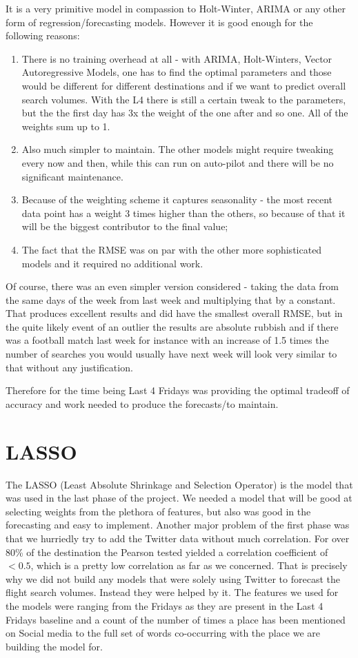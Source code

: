 \documentclass[minf,twoside,singlespacing,parskip,notimes,deptreport]{infthesis} %
\begin{document}
It is a very primitive model in compassion to Holt-Winter, ARIMA or any other form of regression/forecasting models. However it is good enough for the following reasons:
\begin{enumerate}
\item There is no training overhead at all  - with ARIMA, Holt-Winters, Vector Autoregressive Models, one has to find the optimal parameters and those would be different for different destinations and if we want to predict overall search volumes. With the L4 there is still a certain tweak to the parameters, but the the first day has 3x the weight of the one after and so one. All of the weights sum up to 1.
\item Also much simpler to maintain. The other models might require tweaking every now and then, while this can run on auto-pilot and there will be no significant maintenance.
\item Because of the weighting scheme it captures seasonality - the most recent data point has a weight 3 times higher than the others, so  because of that it will be the biggest contributor to the final value; 
\item The fact that the RMSE was on par with the other more sophisticated models and it required no additional work. 
\end{enumerate}

Of course, there was an even simpler version considered - taking the data from the same days of the week from last week and multiplying that by a constant. That produces excellent results and did have the smallest overall RMSE, but in the quite likely event of an outlier the results are absolute rubbish and if there was a football match last week for instance with an increase of 1.5 times the number of searches you would usually have next week will look very similar to that without any justification. 

Therefore for the time being Last 4 Fridays was providing the optimal tradeoff of accuracy and work needed to produce the forecasts/to maintain. 

\section{LASSO}

The LASSO (Least Absolute Shrinkage and Selection Operator) is the model that was used in the last phase of the project. We needed a model that will be good at selecting weights from the plethora of features, but also was good in the forecasting and easy to implement.  Another major problem of the first phase was that we hurriedly try to add the Twitter data without much correlation. For over 80\% of the destination the Pearson tested yielded a correlation coefficient of $<0.5$, which is a pretty low correlation as far as we concerned. That is precisely why we did not build any models that were solely using Twitter to forecast the flight search volumes. Instead they were helped  by it. The features we used for the models were ranging from the Fridays as they are present in the Last 4 Fridays baseline and a count of the number of times a place has been mentioned on Social media to the full set of words co-occurring with the place we are building the model for. 
\end{document}
